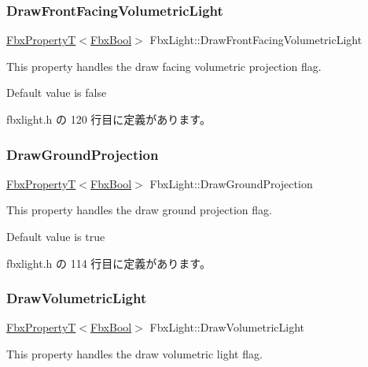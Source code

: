 \subsubsection{\texorpdfstring{Draw\+Front\+Facing\+Volumetric\+Light}{DrawFrontFacingVolumetricLight}}
{\footnotesize\ttfamily \hyperlink{class_fbx_property_t}{Fbx\+PropertyT}$<$\hyperlink{fbxtypes_8h_a92e0562b2fe33e76a242f498b362262e}{Fbx\+Bool}$>$ Fbx\+Light\+::\+Draw\+Front\+Facing\+Volumetric\+Light}

This property handles the draw facing volumetric projection flag.

Default value is false 

 fbxlight.\+h の 120 行目に定義があります。

\mbox{\label{class_fbx_light_a924e57f289e13900b4579d8e8ffdbc93}} 
\subsubsection{\texorpdfstring{Draw\+Ground\+Projection}{DrawGroundProjection}}
{\footnotesize\ttfamily \hyperlink{class_fbx_property_t}{Fbx\+PropertyT}$<$\hyperlink{fbxtypes_8h_a92e0562b2fe33e76a242f498b362262e}{Fbx\+Bool}$>$ Fbx\+Light\+::\+Draw\+Ground\+Projection}

This property handles the draw ground projection flag.

Default value is true 

 fbxlight.\+h の 114 行目に定義があります。

\mbox{\label{class_fbx_light_a80eac74312e16415e3bfc8923a2ae98b}} 
\subsubsection{\texorpdfstring{Draw\+Volumetric\+Light}{DrawVolumetricLight}}
{\footnotesize\ttfamily \hyperlink{class_fbx_property_t}{Fbx\+PropertyT}$<$\hyperlink{fbxtypes_8h_a92e0562b2fe33e76a242f498b362262e}{Fbx\+Bool}$>$ Fbx\+Light\+::\+Draw\+Volumetric\+Light}

This property handles the draw volumetric light flag.

